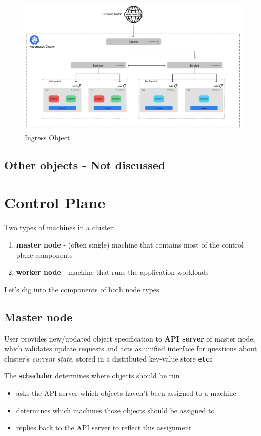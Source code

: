 \begin{figure}[htbp]
   \centering
   \includegraphics{images/K8s_ingress.png}
   \caption{Ingress Object}
   \label{fig:K8s_ingress}
\end{figure}

\subsection*{Other objects - Not discussed}

\section{Control Plane}
Two types of machines in a cluster:
\begin{enumerate}
   \item \textbf{master node} - (often single) machine that contains most of the control plane components
   \item \textbf{worker node} - machine that runs the application workloads
\end{enumerate}

Let's dig into the components of both node types.

\subsection{Master node}

User provides new/updated object specification to \textbf{API server} of master node, 
which
validates update requests and acts as unified interface for questions about cluster's \textit{current state},
stored in a distributed key-value store \texttt{etcd}


The \textbf{scheduler} determines where objects should be run
\begin{itemize}
   \item asks the API server which objects haven't been assigned to a machine
   \item determines which machines those objects should be assigned to
   \item replies back to the API server to reflect this assignment
\end{itemize}

